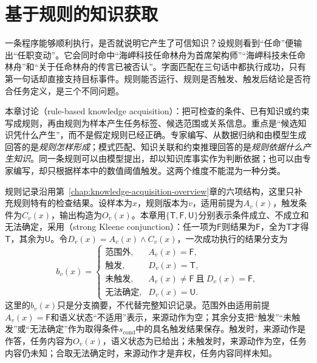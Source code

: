 \chapter{基于规则的知识获取}
\label{chap:rule-based-knowledge-acquisition}

一条程序能够顺利执行，是否就说明它产生了可信知识？设规则看到“任命”便输出“任职变动”。它会同时命中“海岬科技任命林舟为首席架构师”“海岬科技未任命林舟”和“关于任命林舟的传言已被否认”。字面匹配在三句话中都执行成功，只有第一句话却直接支持目标事件。规则能否运行、规则是否触发、触发后结论是否符合任务定义，是三个不同问题。

本章讨论（rule-based knowledge acquisition）：把可检查的条件、已有知识或约束写成规则，再由规则为样本产生任务标签、候选范围或关系信息。重点是“候选知识凭什么产生”，而不是假定规则已经正确。专家编写、从数据归纳和由模型生成回答的是\emph{规则怎样形成}；模式匹配、知识关联和约束推理回答的是\emph{规则依据什么产生知识}。同一条规则可以由模型提出，却以知识库事实作为判断依据；也可以由专家编写，却只根据样本中的数值阈值触发。这两个维度不能混为一种分类。

规则记录沿用第~\ref{chap:knowledge-acquisition-overview}章的六项结构，这里只补充规则特有的检查结果。设样本为$x$，规则版本为$v$，适用前提为$A_v(x)$，触发条件为$C_v(x)$，输出构造为$O_v(x)$。本章用$\{\mathsf{T},\mathsf{F},\mathsf{U}\}$分别表示条件成立、不成立和无法确定，采用（strong Kleene conjunction）：任一项为$\mathsf{F}$则结果为$\mathsf{F}$，全为$\mathsf{T}$才得$\mathsf{T}$，其余为$\mathsf{U}$。令$D_v(x)=A_v(x)\land C_v(x)$，一次成功执行的结果分支为
\begin{equation}
  b_v(x)=
  \begin{cases}
    \text{范围外}, & A_v(x)=\mathsf{F},\\
    \text{触发}, & D_v(x)=\mathsf{T},\\
    \text{未触发}, & A_v(x)\ne\mathsf{F}\ \text{且}\ D_v(x)=\mathsf{F},\\
    \text{无法确定}, & D_v(x)=\mathsf{U}.
  \end{cases}
  \label{eq:rule-based-knowledge-acquisition-interface}
\end{equation}
这里的$b_v(x)$只是分支摘要，不代替完整知识记录。范围外由适用前提$A_v(x)=\mathsf{F}$和语义状态“不适用”表示，来源动作为空；其余分支把“触发”“未触发”或“无法确定”作为取得条件$s_{\mathrm{cond}}$中的具名触发结果保存。触发时，来源动作是作答，任务内容为$O_v(x)$，语义状态为已给出；未触发时，来源动作为空，任务内容仍未知；合取无法确定时，来源动作才是弃权，任务内容同样未知。

